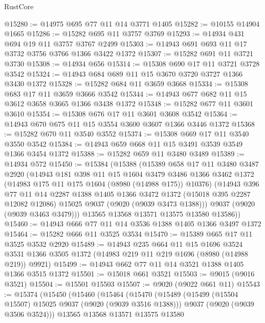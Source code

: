 \begin{lexlean}{RustCore}
\begin{coremodule}
@15280 := @14975 @695 @77 @11 @14 @3771 @1405
@15282 := @10155 @14904 @1665
@15286 := @15282 @695 @11 @3757 @3769
@15293 := @14934 @431 @694 @19 @11 @3757 @3767 @2499
@15303 := @14943 @691 @693 @11 @17 @3732 @3756 @3766 @1366 @3422 @1372
@15307 := @15282 @691 @11 @3721 @3730
@15308 := @14934 @656
@15314 := @15308 @690 @17 @11 @3721 @3728 @3542
@15324 := @14943 @684 @689 @11 @15 @3670 @3720 @3727 @1366 @3430 @1372
@15328 := @15282 @684 @11 @3659 @3668
@15334 := @15308 @683 @17 @11 @3659 @3666 @3542
@15344 := @14943 @677 @682 @11 @15 @3612 @3658 @3665 @1366 @3438 @1372
@15348 := @15282 @677 @11 @3601 @3610
@15354 := @15308 @676 @17 @11 @3601 @3608 @3542
@15364 := @14943 @670 @675 @11 @15 @3554 @3600 @3607 @1366 @3446 @1372
@15368 := @15282 @670 @11 @3540 @3552
@15374 := @15308 @669 @17 @11 @3540 @3550 @3542
@15384 := @14943 @659 @668 @11 @15 @3491 @3539 @3549 @1366 @3454 @1372
@15388 := @15282 @659 @11 @3480 @3489
@15389 := @14934 @572
@15450 := @15384
    (@15388
      (@15389
        @658
        @17
        @11
        @3480
        @3487
        @2920
        (@14943
          @181
          @398
          @11
          @15
          @1604
          @3479
          @3486
          @1366
          @3462
          @1372
          (@14983 @175 @11 @175 @1604 (@8980 (@14988 @175)) @10376)
          (@14943
            @396
            @77
            @11
            @14
            @2287
            @1388
            @1405
            @1366
            @3472
            @1372
            (@15018 @395 @2287 @12082 @12086)
            @15025
            @9037
            (@9020 (@9039 @3473 @1388)))
          @9037
          (@9020 (@9039 @3463 @3479)))
        @13565
        @13568
        @13571
        @13575
        @13580
        @13586))
@15460 := @14943 @666 @77 @11 @14 @3536 @1388 @1405 @1366 @3497 @1372
@15464 := @15282 @666 @11 @3525 @3534
@15470 := @15389 @665 @17 @11 @3525 @3532 @2920
@15489 := @14943
    @235
    @664
    @11
    @15
    @1696
    @3524
    @3531
    @1366
    @3505
    @1372
    (@14983 @219 @11 @219 @1696 (@8980 (@14988 @219)) @9921)
@15499 := @14943 @662 @77 @11 @14 @3521 @1388 @1405 @1366 @3515 @1372
@15501 := @15018 @661 @3521
@15503 := @9015 (@9016 @3521)
@15504 := @15501 @15503
@15507 := @9020 (@9022 @661 @11)
@15543 := @15374
    (@15450
      (@15460
        (@15464
          (@15470
            (@15489
              (@15499 (@15504 @15507) @15025 @9037 (@9020 (@9039 @3516 @1388)))
              @9037
              (@9020 (@9039 @3506 @3524)))
            @13565
            @13568
            @13571
            @13575
            @13580

\end{coremodule}
\end{lexlean}
